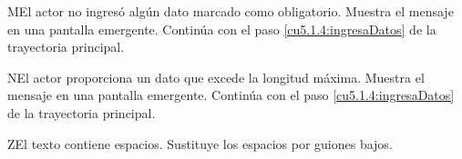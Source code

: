  \begin{UCtrayectoriaA}{M}{El actor no ingresó algún dato marcado como obligatorio.}
    \UCpaso[\UCsist] Muestra el mensaje  en una pantalla emergente.
    \UCpaso[] Continúa con el paso \ref{cu5.1.4:ingresaDatos} de la trayectoria principal.
 \end{UCtrayectoriaA}
 
 \begin{UCtrayectoriaA}{N}{El actor proporciona un dato que excede la longitud máxima.}
    \UCpaso[\UCsist] Muestra el mensaje  en una pantalla emergente.
    \UCpaso[] Continúa con el paso \ref{cu5.1.4:ingresaDatos} de la trayectoria principal.
 \end{UCtrayectoriaA}

  \begin{UCtrayectoriaA}{Z}{El texto contiene espacios.}
     \UCpaso[\UCsist] Sustituye los espacios por guiones bajos.
  \end{UCtrayectoriaA}